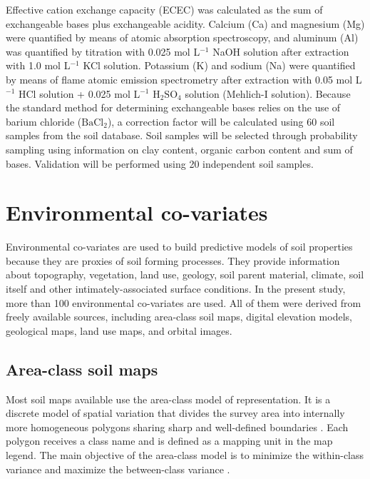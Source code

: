 Effective cation exchange capacity (ECEC) was calculated as the sum of exchangeable bases plus exchangeable acidity. Calcium (Ca) and magnesium (Mg) were quantified by means of atomic absorption spectroscopy, and aluminum (Al) was quantified by titration with 0.025 mol L$^{-1}$ NaOH solution after extraction with 1.0 mol L$^{-1}$ KCl solution. Potassium (K) and sodium (Na) were quantified by means of flame atomic emission spectrometry after extraction with 0.05 mol L$^{-1}$ HCl solution + 0.025 mol L$^{-1}$ $\text{H}_{2}\text{SO}_{4}$ solution (Mehlich-I solution). Because the standard method for determining exchangeable bases relies on the use of barium chloride ($\text{BaCl}_{2}$), a correction factor will be calculated using 60 soil samples from the soil database. Soil samples will be selected through probability sampling using information on clay content, organic carbon content and sum of bases. Validation will be performed using 20 independent soil samples.

\tocless\section{Environmental co-variates}

Environmental co-variates are used to build predictive models of soil properties because they are proxies of soil forming processes. They provide information about topography, vegetation, land use, geology, soil parent material, climate, soil itself and other intimately-associated surface conditions. In the present study, more than 100 environmental co-variates are used. All of them were derived from freely available sources, including area-class soil maps, digital elevation models, geological maps, land use maps, and orbital images.

\tocless\subsection{Area-class soil maps}

Most soil maps available use the area-class model of representation. It is a discrete model of spatial variation that divides the survey area into internally more homogeneous polygons sharing sharp and well-defined boundaries \citep{Rossiter2000}. Each polygon receives a class name and is defined as a mapping unit in the map legend. The main objective of the area-class model is to minimize the within-class variance and maximize the between-class variance \cite{WebsterEtAl1990}.

